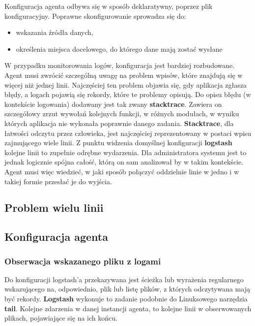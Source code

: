     Konfiguracja agenta odbywa się w sposób deklaratywny, poprzez plik konfiguracyjny. Poprawne
    skonfigurowanie sprowadza się do:
    \begin{itemize}
        \item wskazania źródła danych,
        \item określenia miejsca docelowego, do którego dane mają zostać wysłane
    \end{itemize}
    W przypadku monitorowania logów, konfiguracja jest bardziej rozbudowane.
    Agent musi zwrócić szczególną uwagę na problem wpisów, które znajdują się w więcej niż jednej linii.
    Najczęściej ten problem objawia się, gdy aplikacja zgłasza błędy, a logach pojawią się rekordy, które
    te problemy opisują. Do opisu błędu (w kontekście logowania) dodawany jest tak zwany \textbf{stacktrace}.
    Zawiera on szczegółowy zrzut wywołań kolejnych funkcji, w różnych modułach, w wyniku których aplikacja
    nie wykonała poprawnie danego zadania. \textbf{Stacktrace}, dla łatwości odczytu przez człowieka,
    jest najczęściej reprezentowany w postaci wpisu zajmującego wiele linii. Z punktu widzenia domyślnej
    konfiguracji \textbf{logstash} kolejne linii to zupełnie odrębne wydarzenia. Dla administratora systemu jest
    to jednak logicznie spójna całość, którą on sam analizował by w takim kontekście. Agent musi więc wiedzieć,
    w jaki sposób połączyć oddzielnie linie w jedno i w takiej formie przesłać je do wyjścia.
    
    \subsection{Problem wielu linii}
    
    \subsection{Konfiguracja agenta}
        
        \subsubsection{Obserwacja wskazanego pliku z logami}
            Do konfiguracji logstash'a przekazywana jest ścieżka lub wyrażenia regularnego wskazującego
            na, odpowiednio, plik lub listę plików, z których odczytywana mają być rekordy. \textbf{Logstash}
            wykonuje to zadanie podobnie do Linuksowego narzędzia \textbf{tail}. Kolejne zdarzenia w danej 
            instancji agenta, to kolejne linii w obserwowanych plikach, pojawiające się na ich końcu. 
        
